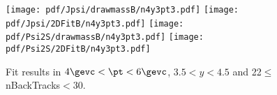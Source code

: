 \begin{figure}[H]
\begin{center}
\texttt{[image: pdf/Jpsi/drawmassB/n4y3pt3.pdf]}
\texttt{[image: pdf/Jpsi/2DFitB/n4y3pt3.pdf]}
\vspace*{-0.5cm}
\texttt{[image: pdf/Psi2S/drawmassB/n4y3pt3.pdf]}
\texttt{[image: pdf/Psi2S/2DFitB/n4y3pt3.pdf]}
\vspace*{-0.5cm}
\end{center}
\caption{Fit results in $4\gevc<\pt<6\gevc$, $3.5<y<4.5$ and 22$\leq$nBackTracks$<$30.}
\label{Fitn4y3pt3}
\end{figure}
